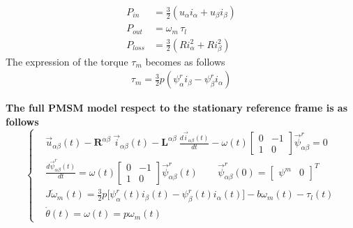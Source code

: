 \documentclass[12pt,a4paper]{scrartcl}
\begin{document}
\begin{onehalfspace}
\begin{equation*}
	\begin{aligned}
		P_{in} &= \frac{3}{2}\left( u_\alpha i_\alpha+u_\beta i_\beta\right)  \\[6pt]
		P_{out} &= \omega_m\,\tau_l \\[6pt]
		P_{loss} &= \frac{3}{2}\left( Ri_\alpha^2+Ri_\beta^2\right) 
	\end{aligned} 
\end{equation*}
The expression of the torque $\tau_m$ becomes as follows
\begin{equation}
	\begin{aligned}
		\tau_m = \frac{3}{2}p\left( \psi^r_{\alpha}i_{\beta}-\psi^r_{\beta}i_{\alpha}\right) 
	\end{aligned} 
\end{equation}

\begin{mybox}
	\textbf{The full PMSM model respect to the stationary reference frame is as follows}
	\begin{equation}\label{twophase_model_ref}
		\left\lbrace \begin{aligned}
			& \vec{u}_{\alpha\beta}(t)-\mathbf{R}^{\alpha\beta}\ \vec{i}_{\alpha\beta}(t)-\mathbf{L}^{\alpha\beta}\ \frac{d\vec{i}_{\alpha\beta}(t)}{dt}-\omega(t) \begin{bmatrix} 0 & -1 \\ 1 & 0\end{bmatrix} \vec{\psi}^r_{\alpha\beta} = 0 \\[6pt]
			& \frac{d\vec{\psi}^r_{\alpha\beta}(t)}{dt} = \omega(t) \begin{bmatrix} 0 & -1 \\ 1 & 0\end{bmatrix} \vec{\psi}^r_{\alpha\beta}(t) \qquad \vec{\psi}^r_{\alpha\beta}(0) = \begin{bmatrix} \psi^m &  0 \end{bmatrix}^T \\[6pt]
			& J\dot{\omega}_m(t) = \frac{3}{2}p\Big[\psi^r_{\alpha}(t)i_{\beta}(t)-\psi^r_{\beta}(t)i_{\alpha}(t)\Big]-b\omega_m(t) -\tau_l(t) \\[6pt]
			& \dot{\theta}(t) = \omega(t) = p\omega_m(t)
		\end{aligned} \right. 
	\end{equation}
\end{mybox}


\end{onehalfspace}
\end{document}
